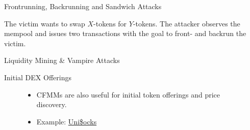 \documentclass[]{beamer}
\begin{document}
\begin{frame}{Frontrunning, Backrunning and Sandwich Attacks}

\small{The victim wants to swap $X$-tokens for $Y$-tokens. The attacker observes the mempool and issues two transactions with the goal to front- and backrun the victim.}

\end{frame}


\begin{frame}{Liquidity Mining \& Vampire Attacks}
	\begin{figure}[h!]
		\begin{center}
			
		\end{center}
	\end{figure}
\end{frame}


\begin{frame}{Initial DEX Offerings}

	\begin{figure}
		\begin{minipage}[c]{0.3\textwidth}
			
		\end{minipage}
		\hfill
		\begin{minipage}[c]{0.5\textwidth}
			\begin{itemize}
				\item CFMMs are also useful for initial token offerings and price discovery.
				\item Example: \href{https://unisocks.exchange/}{Uni\$ocks} \link
			\end{itemize}
		\end{minipage}
	\end{figure}

\end{frame}
\end{document}
